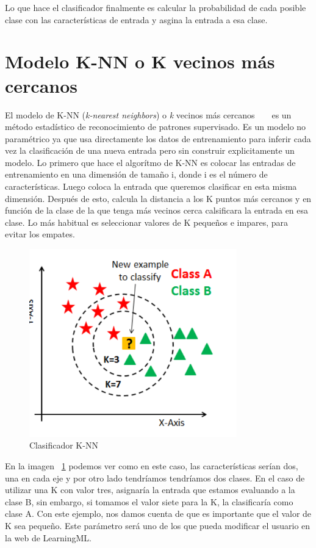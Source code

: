 \documentclass[a4paper, 12pt]{book}
\begin{document}
Lo que hace el clasificador finalmente es calcular la probabilidad de cada posible clase con las características de entrada y asgina la entrada a esa clase.

\section{Modelo K-NN o K vecinos más cercanos} 
\label{sec:modeloknn}

El modelo de K-NN (\emph{k-nearest neighbors}) o \emph{k} vecinos más cercanos ~\cite{knn1} ~\cite{knn2} es un método estadístico de reconocimiento de patrones supervisado. Es un modelo no paramétrico ya que usa directamente los datos de entrenamiento para inferir cada vez la clasificación de una nueva entrada pero sin construir explicitamente un modelo. Lo primero que hace el algorítmo de K-NN es colocar las entradas de entrenamiento en una dimensión de tamaño i, donde i es el número de características. Luego coloca la entrada que queremos clasificar en esta misma dimensión. Después de esto, calcula la distancia a los K puntos más cercanos y en función de la clase de la que tenga más vecinos cerca calsificara la entrada en esa clase. Lo más habitual es seleccionar valores de K pequeños e impares, para evitar los empates. 

\begin{figure}
  \centering
  \includegraphics[width=9cm, keepaspectratio]{img/knn}
  \caption{Clasificador K-NN}\label{fig:knn}
\end{figure}


En la imagen  ~\ref{fig:knn} podemos ver como en este caso, las características serían dos, una en cada eje y por otro lado tendríamos tendríamos dos clases. En el caso de utilizar una K con valor tres, asignaría la entrada que estamos evaluando a la clase B, sin embargo, si tomamos el valor siete para la K, la clasificaría como clase A. Con este ejemplo, nos damos cuenta de que es importante que el valor de K sea pequeño. Este parámetro será uno de los que pueda modificar el usuario en la web de LearningML.
\end{document}

